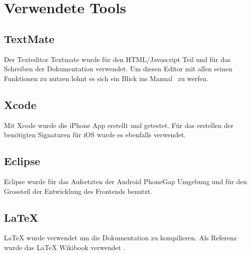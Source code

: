 
\newpage
\section{Verwendete Tools} %
\label{sec:Verwendete Tools}

\subsection{TextMate} %
\label{sub:TextMate}
Der Texteditor Textmate wurde für den HTML/Javascript Teil und für das Schreiben der Dokumentation verwendet. Um diesen Editor mit allen seinen Funktionen zu nutzen lohnt es sich ein Blick ins Manual~\cite{bib:textmate} zu werfen.

\subsection{Xcode} %
\label{ssub:Xcode}
Mit Xcode wurde die iPhone App erstellt und getestet. Für das erstellen der benötigten Signaturen für iOS wurde es ebenfalls verwendet.

\subsection{Eclipse} %
\label{sub:eclispe}
Eclipse wurde für das Aufsetzten der Android PhoneGap Umgebung und für den Grossteil der Entwicklung des Frontends benutzt.

\subsection{LaTeX} %
\label{sub:LaTeX}
LaTeX wurde verwendet um die Dokumentation zu kompilieren. Als Referenz wurde das LaTeX Wikibook verwendet \cite{bib:latex}.
